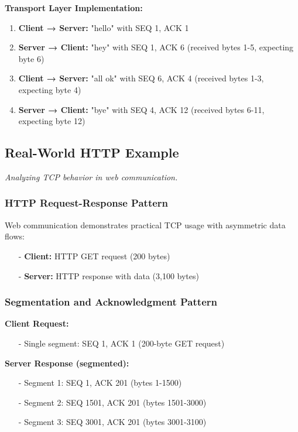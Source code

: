 \documentclass[../../compsys.tex]{subfiles}
\begin{document}
\textbf{Transport Layer Implementation:}
\begin{enumerate}
  \item \textbf{Client → Server:} "hello" with SEQ 1, ACK 1
  \item \textbf{Server → Client:} "hey" with SEQ 1, ACK 6 (received bytes 1-5, expecting byte 6)
  \item \textbf{Client → Server:} "all ok" with SEQ 6, ACK 4 (received bytes 1-3, expecting byte 4)
  \item \textbf{Server → Client:} "bye" with SEQ 4, ACK 12 (received bytes 6-11, expecting byte 12)
\end{enumerate}

\subsection{Real-World HTTP Example}
\textit{Analyzing TCP behavior in web communication.}

\subsubsection{HTTP Request-Response Pattern}
Web communication demonstrates practical TCP usage with asymmetric data flows:

\begin{itemize}
  \item[-] \textbf{Client:} HTTP GET request (200 bytes)
  \item[-] \textbf{Server:} HTTP response with data (3,100 bytes)
\end{itemize}

\subsubsection{Segmentation and Acknowledgment Pattern}
\textbf{Client Request:}
\begin{itemize}
  \item[-] Single segment: SEQ 1, ACK 1 (200-byte GET request)
\end{itemize}

\textbf{Server Response (segmented):}
\begin{itemize}
  \item[-] Segment 1: SEQ 1, ACK 201 (bytes 1-1500)
  \item[-] Segment 2: SEQ 1501, ACK 201 (bytes 1501-3000)  
  \item[-] Segment 3: SEQ 3001, ACK 201 (bytes 3001-3100)
\end{itemize}
\end{document}
